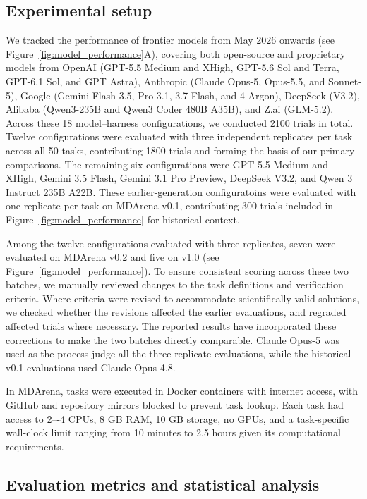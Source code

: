 \documentclass[twoside,twocolumn,9pt]{article}
\begin{document}
\subsection{Experimental setup}

We tracked the performance of frontier models from May 2026 onwards (see Figure~\ref{fig:model_performance}A), covering both open-source and proprietary models from OpenAI (GPT-5.5 Medium and XHigh, GPT-5.6 Sol and Terra, GPT-6.1 Sol, and GPT Astra), Anthropic (Claude Opus-5, Opus-5.5, and Sonnet-5), Google (Gemini Flash 3.5, Pro 3.1, 3.7 Flash, and 4 Argon), DeepSeek (V3.2), Alibaba (Qwen3-235B and Qwen3 Coder 480B A35B), and Z.ai (GLM-5.2). Across these 18 model--harness configurations, we conducted 2100 trials in total. Twelve configurations were evaluated with three independent replicates per task across all 50 tasks, contributing 1800 trials and forming the basis of our primary comparisons. The remaining six configurations were GPT-5.5 Medium and XHigh, Gemini 3.5 Flash, Gemini 3.1 Pro Preview, DeepSeek V3.2, and Qwen 3 Instruct 235B A22B. These earlier-generation configuratoins were evaluated with one replicate per task on MDArena v0.1, contributing 300 trials included in Figure~\ref{fig:model_performance} for historical context. 

Among the twelve configurations evaluated with three replicates, seven were evaluated on MDArena v0.2 and five on v1.0 (see Figure~\ref{fig:model_performance}). To ensure consistent scoring across these two batches, we manually reviewed changes to the task definitions and verification criteria. Where criteria were revised to accommodate scientifically valid solutions, we checked whether the revisions affected the earlier evaluations, and regraded affected trials where necessary. The reported results have incorporated these corrections to make the two batches directly comparable. Claude Opus-5 was used as the process judge all the three-replicate evaluations, while the historical v0.1 evaluations used Claude Opus-4.8.

In MDArena, tasks were executed in Docker containers with internet access, with GitHub and repository mirrors blocked to prevent task lookup. Each task had access to 2–-4 CPUs, 8 GB RAM, 10 GB storage, no GPUs, and a task-specific wall-clock limit ranging from 10 minutes to 2.5 hours given its computational requirements. 

\subsection{Evaluation metrics and statistical analysis}
\end{document}
